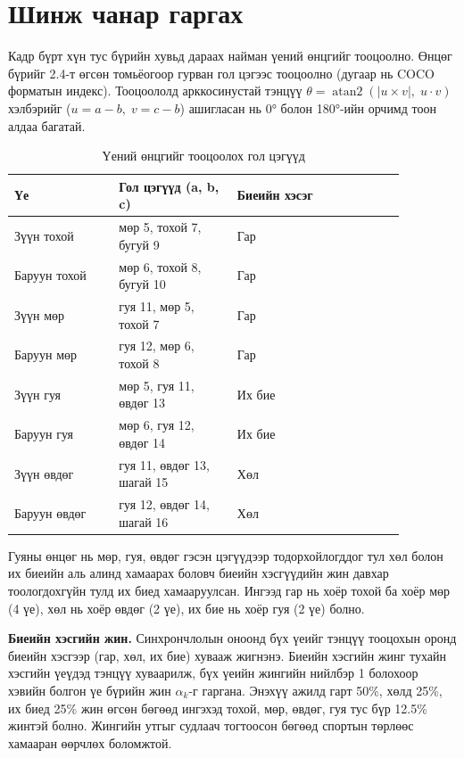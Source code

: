 \section{Шинж чанар гаргах}

Кадр бүрт хүн тус бүрийн хувьд дараах найман үений өнцгийг тооцоолно. Өнцөг бүрийг 2.4-т өгсөн томьёогоор гурван гол цэгээс тооцоолно (дугаар нь COCO форматын индекс). Тооцоололд арккосинустай тэнцүү \(\theta = \operatorname{atan2}(|u \times v|, \; u \cdot v)\) хэлбэрийг (\(u = a - b, \; v = c - b\)) ашигласан нь 0° болон 180°-ийн орчимд тоон алдаа багатай.

\begin{table}[H]
\centering
\caption{Үений өнцгийг тооцоолох гол цэгүүд}
\label{tab:joints}
\small
\begin{tabular}{|>{\raggedright\arraybackslash}p{0.234\linewidth}|>{\raggedright\arraybackslash}p{0.260\linewidth}|>{\raggedright\arraybackslash}p{0.372\linewidth}|}
\hline
\textbf{Үе} & \textbf{Гол цэгүүд (a, b, c)} & \textbf{Биеийн хэсэг} \\ \hline
Зүүн тохой & мөр 5, тохой 7, бугуй 9 & Гар \\ \hline
Баруун тохой & мөр 6, тохой 8, бугуй 10 & Гар \\ \hline
Зүүн мөр & гуя 11, мөр 5, тохой 7 & Гар \\ \hline
Баруун мөр & гуя 12, мөр 6, тохой 8 & Гар \\ \hline
Зүүн гуя & мөр 5, гуя 11, өвдөг 13 & Их бие \\ \hline
Баруун гуя & мөр 6, гуя 12, өвдөг 14 & Их бие \\ \hline
Зүүн өвдөг & гуя 11, өвдөг 13, шагай 15 & Хөл \\ \hline
Баруун өвдөг & гуя 12, өвдөг 14, шагай 16 & Хөл \\ \hline
\end{tabular}
\end{table}

Гуяны өнцөг нь мөр, гуя, өвдөг гэсэн цэгүүдээр тодорхойлогддог тул хөл болон их биеийн аль алинд хамаарах боловч биеийн хэсгүүдийн жин давхар тоологдохгүйн тулд их биед хамааруулсан. Ингээд гар нь хоёр тохой ба хоёр мөр (4 үе), хөл нь хоёр өвдөг (2 үе), их бие нь хоёр гуя (2 үе) болно.

\textbf{Биеийн хэсгийн жин.} Синхрончлолын оноонд бүх үеийг тэнцүү тооцохын оронд биеийн хэсгээр (гар, хөл, их бие) хувааж жигнэнэ. Биеийн хэсгийн жинг тухайн хэсгийн үеүдэд тэнцүү хуваарилж, бүх үеийн жингийн нийлбэр 1 болохоор хэвийн болгон үе бүрийн жин \(\alpha_k\)-г гаргана. Энэхүү ажилд гарт 50\%, хөлд 25\%, их биед 25\% жин өгсөн бөгөөд ингэхэд тохой, мөр, өвдөг, гуя тус бүр 12.5\% жинтэй болно. Жингийн утгыг судлаач тогтоосон бөгөөд спортын төрлөөс хамааран өөрчлөх боломжтой.

